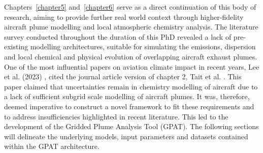 Chapters~\ref{chapter5} and~\ref{chapter6} serve as a direct continuation of this body of research, aiming to provide further real world context through higher-fidelity aircraft plume modelling and local atmospheric chemistry analysis. The literature survey conducted throughout the duration of this PhD revealed a lack of pre-existing modelling architectures, suitable for simulating the emissions, dispersion and local chemical and physical evolution of overlapping aircraft exhaust plumes. One of the most influential papers on aviation climate impact in recent years, Lee et al. (2023) \cite{Lee2023}, cited the journal article version of chapter 2, Tait et al. \cite{Tait2022}. This paper claimed that uncertainties remain in chemistry modelling of aircraft  due to a lack of sufficient subgrid scale modelling of aircraft plumes. It was, therefore, deemed imperative to construct a novel framework to fit these requirements and to address insufficiencies highlighted in recent literature. This led to the development of the Gridded Plume Analysis Tool (GPAT). The following sections will delineate the underlying models, input parameters and datasets contained within the GPAT architecture.

